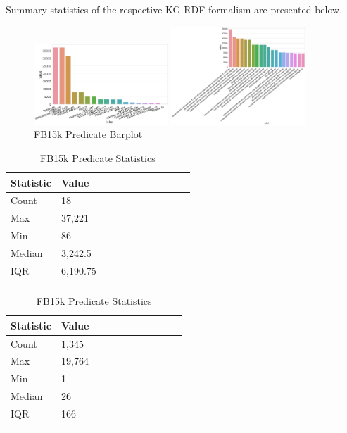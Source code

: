 \noindent Summary statistics of the respective KG RDF formalism are presented below.

\begin{figure}[H]
	\parbox{.5\linewidth}{
   		\centering
    		\includegraphics[width=0.45\textwidth, height=0.2\textheight]{WN18_Predicate_Counts}
		\caption{WN18 Predicate Barplot}
		}
	\hfill
	\parbox{.5\linewidth}{
   		\centering
		\includegraphics[width=0.45\textwidth, height=0.2\textheight]{FB15k_Predicate_Counts}
		\caption{FB15k Predicate Barplot}
		}
\end{figure}

\begin{table}[H]
	\parbox{.5\linewidth}{
		\centering
		\begin{tabular}{lllllllllll}
  			\textbf{Statistic} & \textbf{Value}  \\
  			\hline
			Count & 18 \\
			Max & 37,221  \\
			Min & 86 \\
  			Median & 3,242.5  \\
  			IQR & 6,190.75  \\
			&
		\end{tabular}
		\caption{WN18 Predicate Statistics}
		}
	\hfill
	\parbox{.5\linewidth}{
		\centering
		\begin{tabular}{lllllllllll}
  			\textbf{Statistic} & \textbf{Value}  \\
  			\hline
			Count & 1,345 \\
			Max & 19,764  \\
			Min & 1  \\
  			Median & 26  \\
  			IQR & 166  \\
			&
		\end{tabular}
		\caption{FB15k Predicate Statistics}
		}
\end{table}

